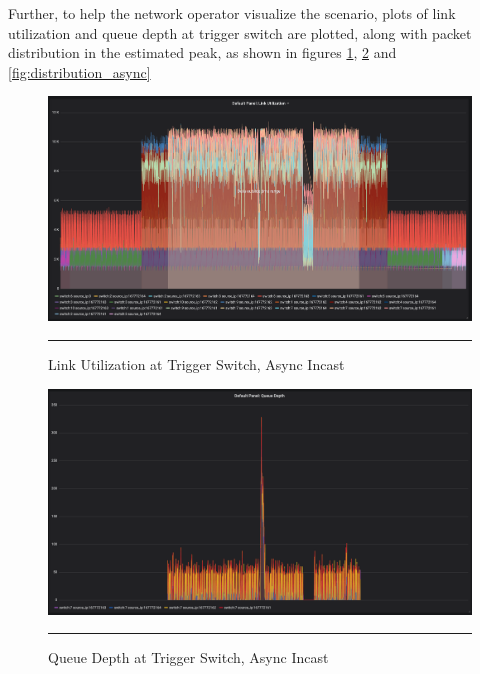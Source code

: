 Further, to help the network operator visualize the scenario, plots of link utilization and queue depth at 
trigger switch are plotted, along with packet distribution in the estimated peak, as shown in figures \ref{fig:link_utilization_async}, \ref{fig:queue_depth_async}
and \ref{fig:distribution_async}



\begin{figure}[htbp]
	\centering
		\includegraphics[width=1.0\columnwidth]{Figures/link_utilization_async.png}
		\rule{35em}{0.5pt}
	\caption[Link Utilization at Trigger Switch, Async Incast]{Link Utilization at Trigger Switch, Async Incast}
	\label{fig:link_utilization_async}
\end{figure}
\begin{figure}[htbp]
	\centering
		\includegraphics[width=1.0\columnwidth]{Figures/queue_depth_async.png}
		\rule{35em}{0.5pt}
	\caption[Queue Depth at Trigger Switch, Async Incast]{Queue Depth at Trigger Switch, Async Incast}
	\label{fig:queue_depth_async}
\end{figure}
